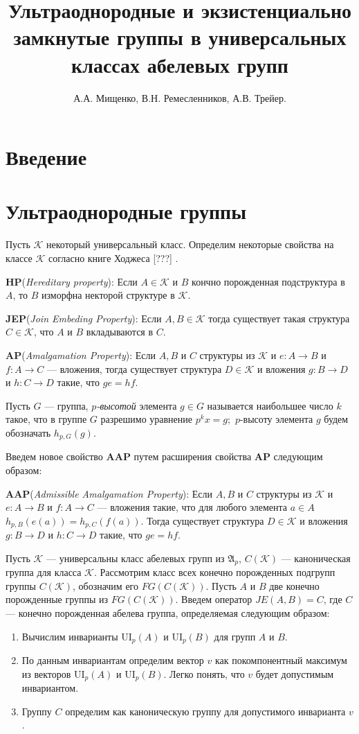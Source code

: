 \documentclass[14pt]{extarticle} %
\title{Ультраоднородные и экзистенциально замкнутые группы в универсальных классах абелевых групп}
\author{А.А. Мищенко, В.Н. Ремесленников, А.В. Трейер.}
\def\A{{\mathfrak{A}}}
\def\K{{\mathcal{K}}}
\def\ui{{\mathrm{UI}}}
\def\HP{\textbf{HP}}
\def\JEP{\textbf{JEP}}
\def\AP{\textbf{AP}}
\def\AAP{\textbf{AAP}}
\begin{document}
\maketitle
\tableofcontents
\listoftodos



\section{Введение}

\section{Ультраоднородные группы}

Пусть $\K$ некоторый универсальный класс. Определим некоторые свойства на классе $\K$ согласно книге Ходжеса [???] .

\noindent \HP  (\textit{Hereditary property}): Если $A \in \K$ и $B$ кончно порожденная подструктура в $A$, то $B$ изморфна некторой структуре в $\K$. 

\noindent \JEP  (\textit{Join Embeding Property}): Если $A, B \in \K$ тогда существует такая структура $C \in \K$, что $A$ и $B$ вкладываются в $C$.

\noindent \AP  (\textit{Amalgamation Property}): Если $A, B$ и $C$ структуры из $\K$ и $e : A \rightarrow B$ и $f : A \rightarrow C$ --- вложения, тогда существует структура $D \in \K$ и вложения $g : B \rightarrow D$ и $h : C \rightarrow D$ такие, что $ge = hf$. 

Пусть $G$ --- группа, \textit{$p$-высотой} элемента $g \in G$ называется наибольшее число $k$ такое, что в группе $G$ разрешимо уравнение $p^k x = g;$ $p$-высоту элемента $g$ будем обозначать $h_{p,G}(g).$ 

Введем новое свойство \AAP{} путем расширения свойства \AP{} следующим образом:

\noindent \AAP (\textit{Admissible Amalgamation Property}): Если $A, B$ и $C$ структуры из $\K$ и $e : A \rightarrow B$ и $f : A \rightarrow C$ --- вложения такие, что для любого элемента $a \in A$ $h_{p,B}(e(a)) = h_{p,C}(f(a))$. Тогда существует структура $D \in \K$ и вложения $g : B \rightarrow D$ и $h : C \rightarrow D$ такие, что $ge = hf$. 

Пусть $\K$ --- универсальны класс абелевых групп из $\A_p$, $C(\K)$ --- каноническая группа для класса $\K$. Рассмотрим класс всех конечно порожденных подгрупп группы $C(\K)$, обозначим его $FG(C(\K))$. Пусть $A$ и $B$ две конечно порожденные группы из $FG(C(\K))$. Введем оператор $JE(A, B) = C$, где $C$ --- конечно порожденная абелева группа, определяемая следующим образом:
\begin{enumerate}
\item Вычислим инварианты $\ui_p(A)$ и $\ui_p(B)$ для групп $A$ и $B$.
\item По данным инвариантам определим вектор $v$ как покомпонентный максимум из векторов $\ui_p(A)$ и $\ui_p(B)$. Легко понять, что $v$ будет допустимым инвариантом.
\item Группу $C$ определим как каноническую группу для допустимого инварианта $v$.
\end{enumerate}
\end{document}
